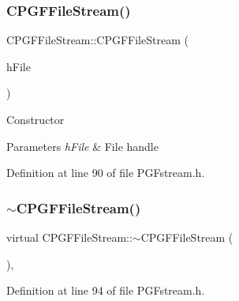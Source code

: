 \subsubsection{\texorpdfstring{CPGFFileStream()}{CPGFFileStream()}\hspace{0.1cm}{\footnotesize\ttfamily [2/2]}}
{\footnotesize\ttfamily C\+P\+G\+F\+File\+Stream\+::\+C\+P\+G\+F\+File\+Stream (\begin{DoxyParamCaption}\item[{H\+A\+N\+D\+LE}]{h\+File }\end{DoxyParamCaption})\hspace{0.3cm}{\ttfamily [inline]}}

Constructor 
\begin{DoxyParams}{Parameters}
{\em h\+File} & File handle \\
\hline
\end{DoxyParams}


Definition at line 90 of file P\+G\+Fstream.\+h.


\begin{DoxyCode}{0}

\end{DoxyCode}
\mbox{\label{classCPGFFileStream_ac9da1053f6b3cb8f3e403060ff7a44ae}} 
\subsubsection{\texorpdfstring{$\sim$CPGFFileStream()}{~CPGFFileStream()}}
{\footnotesize\ttfamily virtual C\+P\+G\+F\+File\+Stream\+::$\sim$\+C\+P\+G\+F\+File\+Stream (\begin{DoxyParamCaption}{ }\end{DoxyParamCaption})\hspace{0.3cm}{\ttfamily [inline]}, {\ttfamily [virtual]}}



Definition at line 94 of file P\+G\+Fstream.\+h.


\begin{DoxyCode}{0}

\end{DoxyCode}


